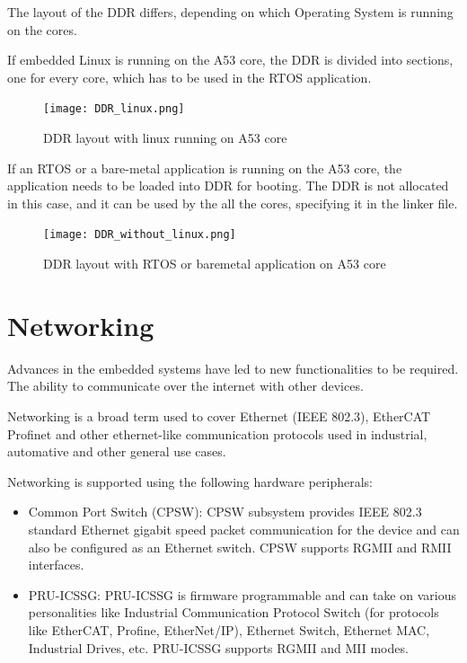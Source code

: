 The layout of the DDR differs, depending on which Operating System is running
on the cores.

If embedded Linux is running on the A53 core, the DDR is divided into sections,
one for every core, which has to be used in the RTOS application.

\begin{figure}[ht]
    \centering
    \texttt{[image: DDR\_linux.png]}
    \caption{DDR layout with linux running on A53 core}
\end{figure}

If an RTOS or a bare-metal application is running on the A53 core, the
application needs to be loaded into DDR for booting.
The DDR is not allocated in this case, and it can be used by the all the cores,
specifying it in the linker file.

\begin{figure}[ht]
    \centering
    \texttt{[image: DDR\_without\_linux.png]}
    \caption{DDR layout with RTOS or baremetal application on A53 core}
\end{figure}

\section{Networking}

Advances in the embedded systems have led to new functionalities to be
required. The ability to communicate over the internet with other devices.

Networking is a broad term used to cover Ethernet (IEEE 802.3), EtherCAT
Profinet and other ethernet-like communication protocols used in industrial,
automative and other general use cases.

Networking is supported using the following hardware peripherals:

\begin{itemize}
    \item   Common Port Switch (CPSW): CPSW subsystem provides IEEE 802.3
            standard Ethernet gigabit speed packet communication for the
            device and can also be configured as an Ethernet switch.
            CPSW supports RGMII and RMII interfaces.
    
    \item   PRU-ICSSG: PRU-ICSSG is firmware programmable and can take on
            various personalities like Industrial Communication Protocol Switch
            (for protocols like EtherCAT, Profine, EtherNet/IP), Ethernet
            Switch, Ethernet MAC, Industrial Drives, etc. PRU-ICSSG supports
            RGMII and MII modes.
\end{itemize}

